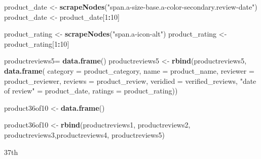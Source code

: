 \documentclass[
]{article}
\newenvironment{Shaded}{\begin{snugshade}}{\end{snugshade}}
\newcommand{\AttributeTok}[1]{\textcolor[rgb]{0.13,0.29,0.53}{#1}}
\newcommand{\DecValTok}[1]{\textcolor[rgb]{0.00,0.00,0.81}{#1}}
\newcommand{\FunctionTok}[1]{\textcolor[rgb]{0.13,0.29,0.53}{\textbf{#1}}}
\newcommand{\NormalTok}[1]{#1}
\newcommand{\OtherTok}[1]{\textcolor[rgb]{0.56,0.35,0.01}{#1}}
\newcommand{\SpecialCharTok}[1]{\textcolor[rgb]{0.81,0.36,0.00}{\textbf{#1}}}
\newcommand{\StringTok}[1]{\textcolor[rgb]{0.31,0.60,0.02}{#1}}
\begin{document}
\begin{Shaded}
\begin{Highlighting}[]
\NormalTok{  product\_date }\OtherTok{\textless{}{-}} \FunctionTok{scrapeNodes}\NormalTok{(}\StringTok{"span.a{-}size{-}base.a{-}color{-}secondary.review{-}date"}\NormalTok{)}
\NormalTok{  product\_date }\OtherTok{\textless{}{-}}\NormalTok{ product\_date[}\DecValTok{1}\SpecialCharTok{:}\DecValTok{10}\NormalTok{]}
  
\NormalTok{  product\_rating }\OtherTok{\textless{}{-}} \FunctionTok{scrapeNodes}\NormalTok{(}\StringTok{"span.a{-}icon{-}alt"}\NormalTok{)}
\NormalTok{  product\_rating }\OtherTok{\textless{}{-}}\NormalTok{ product\_rating[}\DecValTok{1}\SpecialCharTok{:}\DecValTok{10}\NormalTok{]}
  
\NormalTok{  productreviews5}\OtherTok{=} \FunctionTok{data.frame}\NormalTok{()}
\NormalTok{  productreviews5 }\OtherTok{\textless{}{-}} \FunctionTok{rbind}\NormalTok{(productreviews5, }\FunctionTok{data.frame}\NormalTok{(}
                      \AttributeTok{category =}\NormalTok{ product\_category,}
                      \AttributeTok{name =}\NormalTok{ product\_name,}
                      \AttributeTok{reviewer =}\NormalTok{ product\_reviewer,}
                      \AttributeTok{reviews =}\NormalTok{ product\_review,}
                      \AttributeTok{veridied =}\NormalTok{ verified\_reviews,}
                      \StringTok{"date of review"} \OtherTok{=}\NormalTok{ product\_date,}
                      \AttributeTok{ratings =}\NormalTok{ product\_rating))}
  
\NormalTok{  product36of10 }\OtherTok{\textless{}{-}} \FunctionTok{data.frame}\NormalTok{()}
  
\NormalTok{  product36of10 }\OtherTok{\textless{}{-}} \FunctionTok{rbind}\NormalTok{(productreviews1, productreviews2, productreviews3,productreviews4, productreviews5)}
\end{Highlighting}
\end{Shaded}

37th
\end{document}

